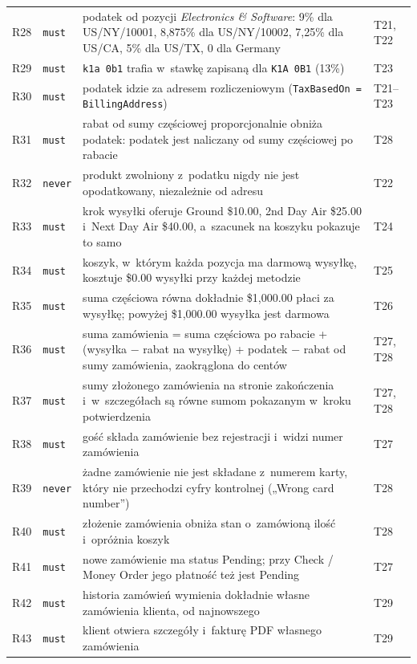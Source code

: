 {\begin{xltabular}{\linewidth}{@{}l l >{\raggedright\arraybackslash}X >{\raggedright\arraybackslash}p{2.2cm}@{}}
R28 & \texttt{must} & podatek od pozycji \emph{Electronics \& Software}: 9\% dla US/NY/10001, 8,875\% dla US/NY/10002, 7,25\% dla US/CA, 5\% dla US/TX, 0 dla Germany & T21, T22 \\
R29 & \texttt{must} & \texttt{k1a 0b1} trafia w~stawkę zapisaną dla \texttt{K1A 0B1} (13\%) & T23 \\
R30 & \texttt{must} & podatek idzie za adresem rozliczeniowym (\texttt{TaxBasedOn = BillingAddress}) & T21--T23 \\
R31 & \texttt{must} & rabat od sumy częściowej proporcjonalnie obniża podatek: podatek jest naliczany od sumy częściowej po rabacie & T28 \\
R32 & \texttt{never} & produkt zwolniony z~podatku nigdy nie jest opodatkowany, niezależnie od adresu & T22 \\
R33 & \texttt{must} & krok wysyłki oferuje Ground \$10.00, 2nd Day Air \$25.00 i~Next Day Air \$40.00, a~szacunek na koszyku pokazuje to samo & T24 \\
R34 & \texttt{must} & koszyk, w~którym każda pozycja ma darmową wysyłkę, kosztuje \$0.00 wysyłki przy każdej metodzie & T25 \\
R35 & \texttt{must} & suma częściowa równa dokładnie \$1,000.00 płaci za wysyłkę; powyżej \$1,000.00 wysyłka jest darmowa & T26 \\
R36 & \texttt{must} & suma zamówienia = suma częściowa po rabacie + (wysyłka − rabat na wysyłkę) + podatek − rabat od sumy zamówienia, zaokrąglona do centów & T27, T28 \\
R37 & \texttt{must} & sumy złożonego zamówienia na stronie zakończenia i~w~szczegółach są równe sumom pokazanym w~kroku potwierdzenia & T27, T28 \\
R38 & \texttt{must} & gość składa zamówienie bez rejestracji i~widzi numer zamówienia & T27 \\
R39 & \texttt{never} & żadne zamówienie nie jest składane z~numerem karty, który nie przechodzi cyfry kontrolnej („Wrong card number”) & T28 \\
R40 & \texttt{must} & złożenie zamówienia obniża stan o~zamówioną ilość i~opróżnia koszyk & T28 \\
R41 & \texttt{must} & nowe zamówienie ma status Pending; przy Check / Money Order jego płatność też jest Pending & T27 \\
R42 & \texttt{must} & historia zamówień wymienia dokładnie własne zamówienia klienta, od najnowszego & T29 \\
R43 & \texttt{must} & klient otwiera szczegóły i~fakturę PDF własnego zamówienia & T29 \\

\end{xltabular}}
